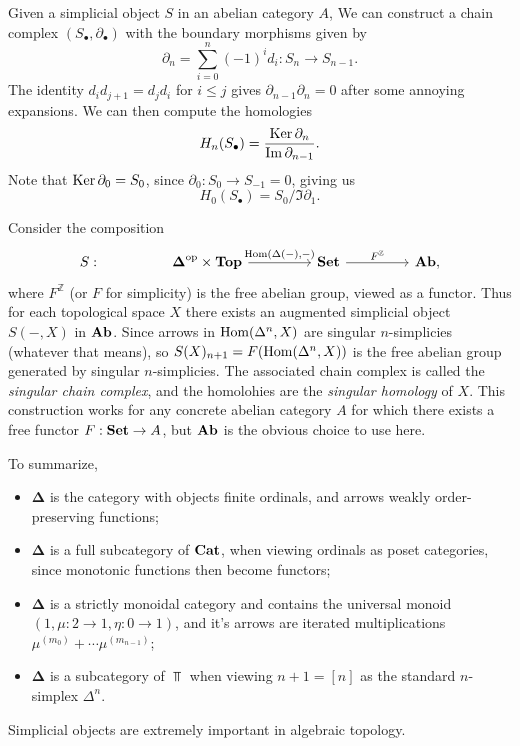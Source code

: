 Given a simplicial object $S$ in an abelian category $A$, We can construct a chain complex $(S_{\bullet} ,\partial _{\bullet} )$ with the boundary morphisms given by
\[
	\partial_n=\sum_{i=0}^{n} (-1)^i d_i : S_n \to S_{n-1} 
.\]
The identity $d_id_{j+1} =d_jd_i$ for $i\leq j$ gives $\partial_{n-1} \partial _n=0$ after some annoying expansions. We can then compute the homologies
\[
	H_n(S_{\bullet} )=\frac{\operatorname{Ker} \partial _n}{\operatorname{Im} \partial _{n-1} } 
.\]
Note that $\operatorname{Ker} \partial _0=S_0$, since $\partial _0 : S_0 \to S_{-1} =0$, giving us
\[
	H_0(S_{\bullet} )=S_0/\Im \partial_1
.\]

Consider the composition
\[\begin{tikzcd}[row sep = 2.5em, column sep = 4.5em]
	S:&\boldsymbol{\Delta} ^{\mathrm{op} } \times \Top \ar[" \Hom(\Delta(-)\text{,} -)  ", r]  & \Set \ar[" F^{\mathbb{Z} }  ", r]  & \Ab,
\end{tikzcd}\]
where $F^{\mathbb{Z} } $ (or $F$ for simplicity) is the free abelian group, viewed as a functor. Thus for each topological space $X$ there exists an augmented simplicial object $S(-,X)$ in $\mathbf{Ab}$. Since arrows in $\operatorname{Hom}(\Delta^n, X) $ are singular $n$-simplicies (whatever that means), so $S(X)_{n+1} =F(\operatorname{Hom}(\Delta^n, X) )$ is the free abelian group generated by singular $n$-simplicies. The associated chain complex is called the \emph{singular chain complex}, and the homolohies are the \emph{singular homology} of $X$. This construction works for any concrete abelian category $A$ for which there exists a free functor $F : \mathbf{Set}  \to A$, but $\mathbf{Ab}$ is the obvious choice to use here.

To summarize,
\begin{itemize}
	\item $\boldsymbol{\Delta} $ is the category with objects finite ordinals, and arrows weakly order-preserving functions;
	\item $\boldsymbol{\Delta} $ is a full subcategory of $\mathbf{Cat} $, when viewing ordinals as poset categories, since monotonic functions then become functors;
	\item $\boldsymbol{\Delta} $ is a strictly monoidal category and contains the universal monoid $(1,\mu : 2 \to 1,\eta : 0 \to 1)$, and it's arrows are iterated multiplications $\mu^{(m_0)} + \cdots \mu^{(m_{n-1} )} $;
	\item $\boldsymbol{\Delta} $ is a subcategory of $\Top $ when viewing $n+1=[n]$ as the standard $n$-simplex $\Delta^n$.
\end{itemize}
Simplicial objects are extremely important in algebraic topology.

